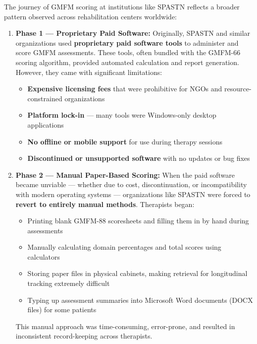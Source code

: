 \documentclass[11pt,a4paper]{article}
\begin{document}
The journey of GMFM scoring at institutions like SPASTN reflects a broader pattern observed across rehabilitation centers worldwide:

\begin{enumerate}[leftmargin=2em, itemsep=4pt]
    \item \textbf{Phase 1 --- Proprietary Paid Software:} Originally, SPASTN and similar organizations used \textbf{proprietary paid software tools} to administer and score GMFM assessments. These tools, often bundled with the GMFM-66 scoring algorithm, provided automated calculation and report generation. However, they came with significant limitations:
    \begin{itemize}[leftmargin=1.5em, itemsep=2pt]
        \item \textbf{Expensive licensing fees} that were prohibitive for NGOs and resource-constrained organizations
        \item \textbf{Platform lock-in} --- many tools were Windows-only desktop applications
        \item \textbf{No offline or mobile support} for use during therapy sessions
        \item \textbf{Discontinued or unsupported software} with no updates or bug fixes
    \end{itemize}
    
    \item \textbf{Phase 2 --- Manual Paper-Based Scoring:} When the paid software became unviable --- whether due to cost, discontinuation, or incompatibility with modern operating systems --- organizations like SPASTN were forced to \textbf{revert to entirely manual methods}. Therapists began:
    \begin{itemize}[leftmargin=1.5em, itemsep=2pt]
        \item Printing blank GMFM-88 scoresheets and filling them in by hand during assessments
        \item Manually calculating domain percentages and total scores using calculators
        \item Storing paper files in physical cabinets, making retrieval for longitudinal tracking extremely difficult
        \item Typing up assessment summaries into Microsoft Word documents (DOCX files) for some patients
    \end{itemize}
    This manual approach was time-consuming, error-prone, and resulted in inconsistent record-keeping across therapists.
    

\end{enumerate}
\end{document}
